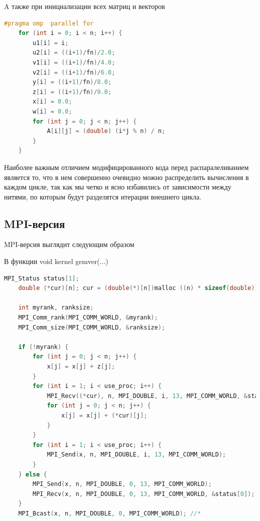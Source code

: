 \documentclass{article}
\begin{document}
\vspace{0.5cm}
A также при инициализации всех матриц и векторов
\begin{lstlisting}[language = C]
    #pragma omp  parallel for
    for (int i = 0; i < n; i++) {
        u1[i] = i;
        u2[i] = ((i+1)/fn)/2.0;
        v1[i] = ((i+1)/fn)/4.0;
        v2[i] = ((i+1)/fn)/6.0;
        y[i] = ((i+1)/fn)/8.0;
        z[i] = ((i+1)/fn)/9.0;
        x[i] = 0.0;
        w[i] = 0.0;
        for (int j = 0; j < n; j++) {
            A[i][j] = (double) (i*j % n) / n;
        }
    }
\end{lstlisting}
\vspace{0.5cm}

Наиболее важным отличием модифицированного кода перед распаралеливанием является то, что в нем совершенно очевидно можно распределить вычисления в каждом цикле, так как мы четко и ясно избавились от зависимости между нитями, по которым будут разделятся итерации внешнего цикла.

\subsection{MPI-версия}

MPI-версия выглядит следующим образом

\vspace{0.5cm}
В функции void kernel gemver(...)

\begin{lstlisting}[language = C]
    MPI_Status status[1];
    double (*cur)[n]; cur = (double(*)[n])malloc ((n) * sizeof(double));

    int myrank, ranksize;
    MPI_Comm_rank(MPI_COMM_WORLD, &myrank);
    MPI_Comm_size(MPI_COMM_WORLD, &ranksize);

    if (!myrank) {
        for (int j = 0; j < n; j++) {
            x[j] = x[j] + z[j];
        }
        for (int i = 1; i < use_proc; i++) {
            MPI_Recv((*cur), n, MPI_DOUBLE, i, 13, MPI_COMM_WORLD, &status[0]);
            for (int j = 0; j < n; j++) {
                x[j] = x[j] + (*cur)[j];
            }
        }
        for (int i = 1; i < use_proc; i++) {                           //for use * comment it
            MPI_Send(x, n, MPI_DOUBLE, i, 13, MPI_COMM_WORLD);         //for use * comment it
        }                                                              //for use * comment it
    } else {
        MPI_Send(x, n, MPI_DOUBLE, 0, 13, MPI_COMM_WORLD);
        MPI_Recv(x, n, MPI_DOUBLE, 0, 13, MPI_COMM_WORLD, &status[0]); //for use * comment it
    }
    MPI_Bcast(x, n, MPI_DOUBLE, 0, MPI_COMM_WORLD); //*
\end{lstlisting}
\end{document}
